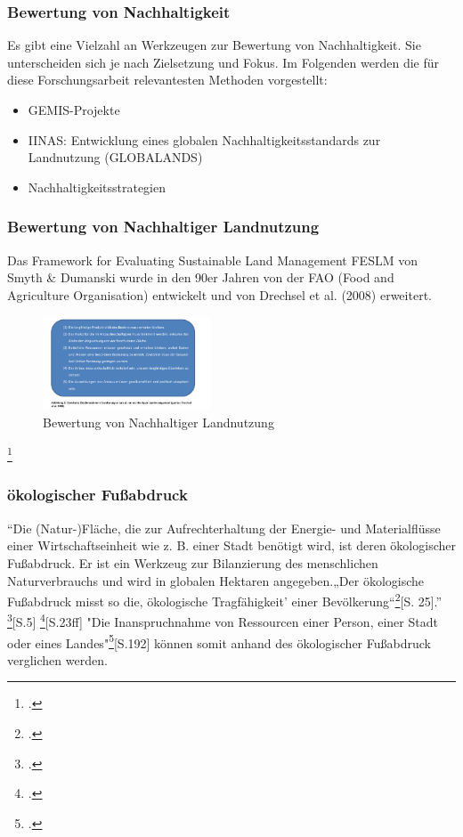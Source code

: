 \documentclass{scrartcl}
\begin{document}
\subsubsection{Bewertung von Nachhaltigkeit}
Es gibt eine Vielzahl an Werkzeugen zur Bewertung von Nachhaltigkeit. Sie unterscheiden sich je nach Zielsetzung und Fokus. Im Folgenden werden die für diese Forschungsarbeit relevantesten Methoden vorgestellt: 

\begin{itemize}
-Analyse und SEEBALANCE®
\item GEMIS-Projekte
\item IINAS: Entwicklung eines globalen Nachhaltigkeitsstandards zur Landnutzung (GLOBALANDS)
\item Nachhaltigkeitsstrategien
\end{itemize}

\subsubsection{Bewertung von Nachhaltiger Landnutzung}
Das Framework for Evaluating Sustainable Land Management FESLM von Smyth & Dumanski wurde in den 90er Jahren von der FAO (Food and Agriculture Organisation) entwickelt und von Drechsel et al. (2008) erweitert.
\begin{figure}[h]
\centering
\includegraphics[width=5cm]{image_folder/drechsel.png}
\caption{Bewertung von Nachhaltiger Landnutzung}
\label{fig:Bewertung von Nachhaltiger Landnutzung}
\end{figure}\footcite{TobiasSpringDerBasel-Stadt, S.17}

\subsubsection{ökologischer Fußabdruck}
“Die (Natur-)Fläche, die zur Aufrechterhaltung der Energie- und Materialflüsse einer Wirtschaftseinheit wie z. B. einer Stadt benötigt wird, ist deren ökologischer Fußabdruck. Er ist ein Werkzeug zur Bilanzierung des menschlichen Naturverbrauchs und wird in globalen Hektaren angegeben.„Der ökologische Fußabdruck misst so die‚ ökologische Tragfähigkeit’ einer Bevölkerung“\footcite{MathisWackernagelUnserNimmt}[S. 25].” \footcite{MichelsenGrundlagenEntwicklung}[S.5] 
\footcite[vgl.]{MathisWackernagelUnserNimmt}[S.23ff]
"Die Inanspruchnahme von Ressourcen einer Person, einer Stadt oder eines Landes"\footcite{AntjeFlade2015StadtStadtforschung}[S.192] können somit anhand des ökologischer Fußabdruck verglichen werden. 
\end{document}
